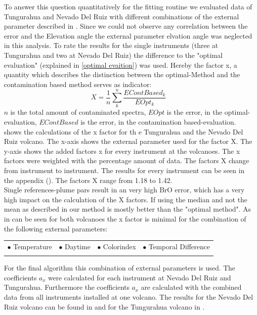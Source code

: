 \documentclass  [
  paper    = a4,
  BCOR     = 10mm,
  twoside,
  fontsize = 12pt,
  fleqn,
  toc      = bibnumbered,
  toc      = listofnumbered,
  numbers  = noendperiod,
  headings = normal,
  listof   = leveldown,
  version  = 3.03
]                                       {scrreprt}
\begin{document}
	To answer this question quantitatively for the fitting routine we evaluated data of Tungurahua and Nevado Del Ruiz with different combinations of the external parameter described in . Since we could not observe any correlation between the  error and the Elevation angle the external parameter elvation angle was neglected in this analysis. To rate the results for the single instruments (three at Tungurahua and two at Nevado Del Ruiz) the difference to the "optimal evaluation" (explained in \ref{optimal evaition}) was used. Hereby the factor x, a quantity which describes the distinction between the optimal-Method and the contamination based method serves as indicator:
	\begin{equation}
	X = \frac{1}{n}\sum_{k}^{n} \frac{EContBased_{ k}}{EOpt_{ k}}
	\label{eq:mean}
	\end{equation}
	$n$ is the total amount of contaminated spectra, $EOpt$ is the   error, in the optimal-evaluation, $EContBased$ is the   error, in the contamination based-evaluation. 
	 shows the calculations of the x factor for th e Tungurahua and the Nevado Del Ruiz volcano. The x-axis shows the external parameter used for the factor X. The y-axis shows the added factors x for every instrument at the volcanoes. The x factors were weighted with the percentage amount of data.
	The factors X change from instrument to instrument. The results for every instrument can be seen in the appendix (). The factors X range from 1.18 to 1.42.\\
	Single references-plume pars result in an very high BrO error, which has a very high impact on the calculation of the X factors. 
	If using the median and not the mean as described in  our method is mostly better than the "optimal method".
	As in  can be seen  for both volcanoes the x factor is minimal for the combination of the following external parameters:\\
	
	\begin{table}[h!]
			\begin{tabular}{cccc}
		$\bullet$ Temperature & $\bullet$ Daytime&  $\bullet$ Colorindex & $\bullet$ Temporal Difference\\
		\label{tab:importantexternalParam}
		\end{tabular}
	\end{table}
%	

	For the final algorithm this combination of external parameters is used.
	The coefficients $a_{x}$ were calculated for each instrument at Nevado Del Ruiz and Tungurahua. Furthermore the coefficients $a_{x}$ are calculated with the combined data from all instruments installed at one volcano. The results for the Nevado Del Ruiz volcano can be found in  and for the Tungurahua volcano in .
\end{document}

